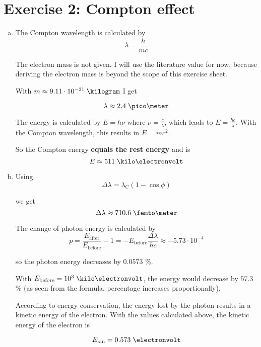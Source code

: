 \documentclass[a4paper,german,12pt,smallheadings]{scrartcl}
\begin{document}
\section*{Exercise 2: Compton effect}

\begin{enumerate}[a)]
  \item
    The Compton wavelength is calculated by
    \begin{equation*}
      \lambda = \frac{h}{mc}
    \end{equation*}

    The electron mass is not given. I will use the literature value for now,
    because deriving the electron mass is beyond the scope of this exercise
    sheet.

    With $m \approx 9.11 \cdot 10^{-31} \; \kilogram$ I get

    \begin{equation*}
      \lambda \approx 2.4 \; \pico\meter
    \end{equation*}

    The energy is calculated by $E = h \nu$ where $\nu = \frac{c}{\lambda}$,
    which leads to $E = \frac{hc}{\lambda}$. With the Compton wavelength, this
    results in $E=mc^2$.

    So the Compton energy \textbf{equals the rest energy} and is
    \begin{equation*}
      E \approx 511 \; \kilo\electronvolt
    \end{equation*}

  \item
    Using
    \begin{equation*}
      \Delta \lambda = \lambda_{\text{C}} \left( 1 - \cos \phi \right)
    \end{equation*}

    we get
    \begin{equation*}
      \Delta \lambda \approx 710.6 \; \femto\meter
    \end{equation*}

    The change of photon energy is calculated by
    \begin{equation*}
      p = \frac{E_\text{after}}{E_\text{before}} - 1 = - E_{\text{before}} \frac{\Delta\lambda}{hc} \approx - 5.73 \cdot 10^{-4}
    \end{equation*}

    so the photon energy decreases by $0.0573$ \%.

    With $E_{\text{before}} = 10^3 \; \kilo\electronvolt$, the energy would
    decrease by $57.3$ \% (as seen from the formula, percentage increases
    proportionally).

    According to energy conservation, the energy lost by the photon results in
    a kinetic energy of the electron. With the values calculated above, the
    kinetic energy of the electron is

    \begin{equation*}
      E_\text{kin} = 0.573 \; \electronvolt
    \end{equation*}
\end{enumerate}
\end{document}
